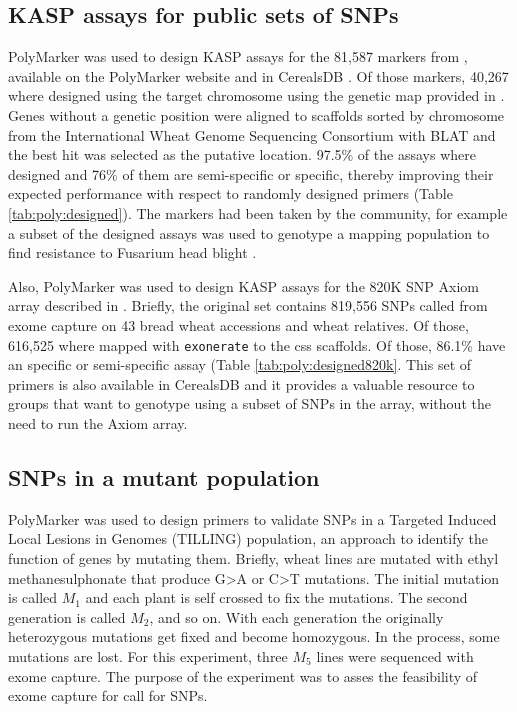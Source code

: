 \subsection{KASP assays for public sets of SNPs} 

PolyMarker was used to design KASP assays for the 81,587 markers from \citep{Wang2014}, available on the PolyMarker website and in CerealsDB \citep{Wilkinson2012}. 
Of those markers, 40,267 where designed using the target chromosome using the genetic map provided in \citet{Wang2014}.  
Genes without a genetic position were aligned to scaffolds sorted by chromosome from the International Wheat Genome Sequencing Consortium \citep{Mayer2014} with BLAT \citep{Kent2002} and the best hit was selected as the putative location. 
97.5\% of the assays where designed and 76\% of them are semi-specific or specific, thereby improving their expected performance with respect to randomly designed primers (Table \ref{tab:poly:designed}). 
The markers had been taken by the community, for example a subset of the designed assays was used to genotype a mapping population to find resistance to Fusarium head blight \citep{Burt2015}. 


Also, PolyMarker was used to design KASP assays for the 820K SNP Axiom array described in \citet{Winfield2016}. 
Briefly, the original set contains 819,556 SNPs called from exome capture on 43 bread wheat accessions and wheat relatives. 
Of those, 616,525 where mapped with \verb|exonerate| \citep{Slater2005} to the \acrshort{css} scaffolds. 
Of those, 86.1\% have an specific or semi-specific assay (Table \ref{tab:poly:designed820k}. 
This set of primers is also available in CerealsDB and it provides a valuable resource to groups that want to genotype using a subset of SNPs in the array, without the need to run the Axiom array. 




\subsection{SNPs in a mutant population}

PolyMarker was used to design primers to validate SNPs in a Targeted Induced Local Lesions in Genomes (TILLING) population, an approach to identify the function of genes by mutating them. 
Briefly, wheat lines are mutated with ethyl methanesulphonate that produce G>A or C>T mutations. 
The initial mutation is called $M_{1}$ and each plant is self crossed to fix the mutations. 
The second generation is called $M_{2}$, and so on. 
With each generation the originally heterozygous mutations get fixed and become homozygous. 
In the process, some mutations are lost. 
For this experiment, three $M_{5}$ lines were sequenced with exome capture. 
The purpose of the experiment was to asses the feasibility of exome capture for call for SNPs.  

